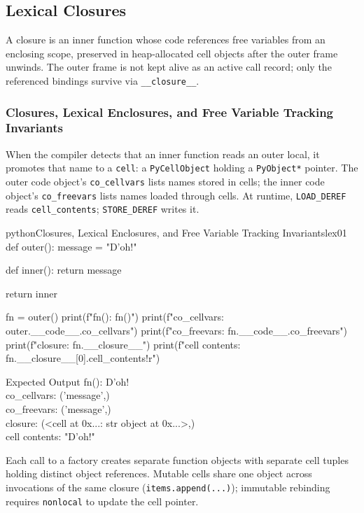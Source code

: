 \subsection{Lexical Closures}

A closure is an inner function whose code references free variables from an enclosing scope, preserved in heap-allocated cell objects after the outer frame unwinds. The outer frame is not kept alive as an active call record; only the referenced bindings survive via \texttt{\_\_closure\_\_}.

\subsubsection{Closures, Lexical Enclosures, and Free Variable Tracking Invariants}

When the compiler detects that an inner function reads an outer local, it promotes that name to a \texttt{cell}: a \texttt{PyCellObject} holding a \texttt{PyObject*} pointer. The outer code object's \texttt{co\_cellvars} lists names stored in cells; the inner code object's \texttt{co\_freevars} lists names loaded through cells. At runtime, \texttt{LOAD\_DEREF} reads \texttt{cell\_contents}; \texttt{STORE\_DEREF} writes it.

\begin{codebox}[]{python}{Closures, Lexical Enclosures, and Free Variable Tracking Invariants}{lex01}
def outer():
    message = "D'oh!"

    def inner():
        return message

    return inner

fn = outer()
print(f"fn(): {fn()}")
print(f"co_cellvars: {outer.__code__.co_cellvars}")
print(f"co_freevars: {fn.__code__.co_freevars}")
print(f"closure: {fn.__closure__}")
print(f"cell contents: {fn.__closure__[0].cell_contents!r}")
\end{codebox}


\begin{iobox}{Expected Output}
fn(): D'oh! \\
co\_cellvars: ('message',) \\
co\_freevars: ('message',) \\
closure: (<cell at 0x...: str object at 0x...>,) \\
cell contents: "D'oh!" \\
\end{iobox}




Each call to a factory creates separate function objects with separate cell tuples holding distinct object references. Mutable cells share one object across invocations of the same closure (\texttt{items.append(...)}); immutable rebinding requires \texttt{nonlocal} to update the cell pointer.

